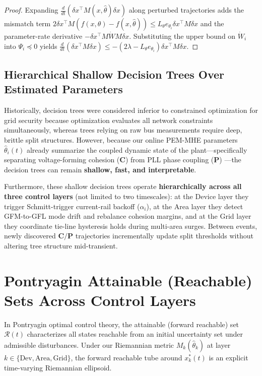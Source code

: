 \documentclass[journal]{IEEEtran}
\begin{document}
\begin{proof}
Expanding $\frac{d}{dt}(\delta x^\top M(x, \hat{\theta}) \delta x)$ along perturbed trajectories adds the mismatch term $2\delta x^\top M (f(x, \theta) - f(x, \hat{\theta})) \le L_{\theta} e_{\theta_i} \delta x^\top M \delta x$ and the parameter-rate derivative $-\delta x^\top M \dot{W} M \delta x$. Substituting the upper bound on $\dot{W}_i$ into $\Psi_i \preceq 0$ yields $\frac{d}{dt}(\delta x^\top M \delta x) \le -(2\lambda - L_{\theta} e_{\theta_i})\delta x^\top M \delta x$.
\end{proof}

\subsection{Hierarchical Shallow Decision Trees Over Estimated Parameters}
Historically, decision trees were considered inferior to constrained optimization for grid security because optimization evaluates all network constraints simultaneously, whereas trees relying on raw bus measurements require deep, brittle split structures. However, because our online PEM-MHE parameters $\hat{\theta}_i(t)$ already summarize the coupled dynamic state of the plant—specifically separating voltage-forming cohesion ($\mathbf{C}$) from PLL phase coupling ($\mathbf{P}$) \cite{sherman26}—the decision trees can remain \textbf{shallow, fast, and interpretable}.

Furthermore, these shallow decision trees operate \textbf{hierarchically across all three control layers} (not limited to two timescales): at the Device layer they trigger Schmitt-trigger current-rail backoff ($\alpha_i$), at the Area layer they detect GFM-to-GFL mode drift and rebalance cohesion margins, and at the Grid layer they coordinate tie-line hysteresis holds during multi-area surges. Between events, newly discovered $\mathbf{C}/\mathbf{P}$ trajectories incrementally update split thresholds without altering tree structure mid-transient.

\section{Pontryagin Attainable (Reachable) Sets Across Control Layers}
In Pontryagin optimal control theory, the attainable (forward reachable) set $\mathcal{R}(t)$ characterizes all states reachable from an initial uncertainty set under admissible disturbances. Under our Riemannian metric $M_k(\hat{\theta}_k)$ at layer $k \in \{\text{Dev}, \text{Area}, \text{Grid}\}$, the forward reachable tube around $x_k^*(t)$ is an explicit time-varying Riemannian ellipsoid.
\end{document}
